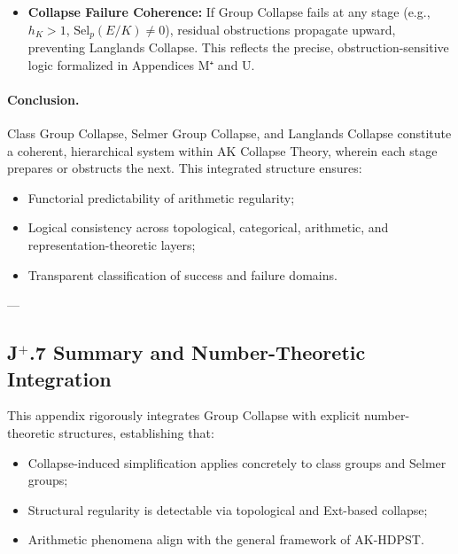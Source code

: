 \documentclass[11pt]{article}
\begin{document}
\begin{itemize}
    \item \textbf{Collapse Failure Coherence:}  
    If Group Collapse fails at any stage (e.g., \( h_K > 1 \), \( \mathrm{Sel}_p(E/K) \neq 0 \)), residual obstructions propagate upward, preventing Langlands Collapse. This reflects the precise, obstruction-sensitive logic formalized in Appendices M⁺ and U.

\end{itemize}

\paragraph{Conclusion.}  
Class Group Collapse, Selmer Group Collapse, and Langlands Collapse constitute a coherent, hierarchical system within AK Collapse Theory, wherein each stage prepares or obstructs the next. This integrated structure ensures:

\begin{itemize}
    \item Functorial predictability of arithmetic regularity;
    \item Logical consistency across topological, categorical, arithmetic, and representation-theoretic layers;
    \item Transparent classification of success and failure domains.
\end{itemize}

---

\subsection*{J$^{+}$.7 Summary and Number-Theoretic Integration}

This appendix rigorously integrates Group Collapse with explicit number-theoretic structures, establishing that:

\begin{itemize}
    \item Collapse-induced simplification applies concretely to class groups and Selmer groups;
    \item Structural regularity is detectable via topological and Ext-based collapse;
    \item Arithmetic phenomena align with the general framework of AK-HDPST.
\end{itemize}



\end{document}

